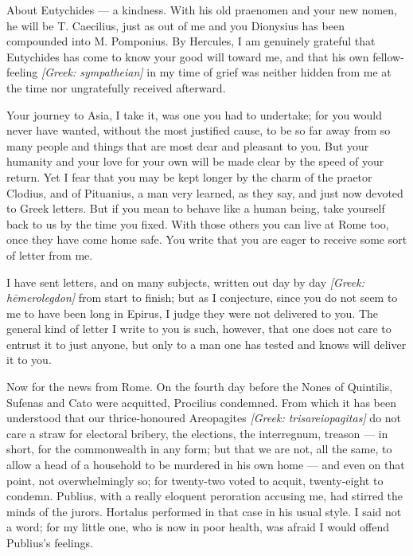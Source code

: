 

 About Eutychides --- a kindness. With his old praenomen and your new nomen, he will be T. Caecilius, just as out of me and you Dionysius has been compounded into M. Pomponius. By Hercules, I am genuinely grateful that Eutychides has come to know your good will toward me, and that his own fellow-feeling \textit{[Greek: sympatheian]} in my time of grief was neither hidden from me at the time nor ungratefully received afterward.

 Your journey to Asia, I take it, was one you had to undertake; for you would never have wanted, without the most justified cause, to be so far away from so many people and things that are most dear and pleasant to you. But your humanity and your love for your own will be made clear by the speed of your return. Yet I fear that you may be kept longer by the charm of the praetor Clodius, and of Pituanius, a man very learned, as they say, and just now devoted to Greek letters. But if you mean to behave like a human being, take yourself back to us by the time you fixed. With those others you can live at Rome too, once they have come home safe. You write that you are eager to receive some sort of letter from me.

 I have sent letters, and on many subjects, written out day by day \textit{[Greek: hēmerolegdon]} from start to finish; but as I conjecture, since you do not seem to me to have been long in Epirus, I judge they were not delivered to you. The general kind of letter I write to you is such, however, that one does not care to entrust it to just anyone, but only to a man one has tested and knows will deliver it to you.

 Now for the news from Rome. On the fourth day before the Nones of Quintilis, Sufenas and Cato were acquitted, Procilius condemned. From which it has been understood that our thrice-honoured Areopagites \textit{[Greek: trisareiopagitas]} do not care a straw for electoral bribery, the elections, the interregnum, treason --- in short, for the commonwealth in any form; but that we are not, all the same, to allow a head of a household to be murdered in his own home --- and even on that point, not overwhelmingly so; for twenty-two voted to acquit, twenty-eight to condemn. Publius, with a really eloquent peroration accusing me, had stirred the minds of the jurors. Hortalus performed in that case in his usual style. I said not a word; for my little one, who is now in poor health, was afraid I would offend Publius's feelings.

